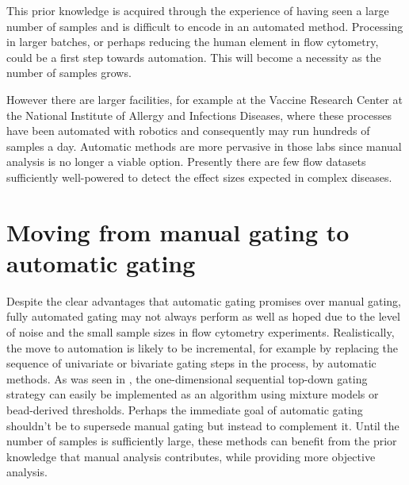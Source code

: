 This prior knowledge is acquired through the experience of having seen a large number of samples and is difficult to encode in an automated method.
Processing in larger batches, or perhaps reducing the human element in flow cytometry, could be a first step towards automation.
This will become a necessity as the number of samples grows.

However there are larger facilities, for example at the Vaccine Research Center at the National Institute of Allergy and Infections Diseases, where these processes have been automated with robotics and consequently may run hundreds of samples a day.
Automatic methods are more pervasive in those labs since manual analysis is no longer a viable option.
Presently there are few flow datasets sufficiently well-powered to detect the effect sizes expected in complex diseases.


\section{ Moving from manual gating to automatic gating }

Despite the clear advantages that automatic gating promises over manual gating, fully automated gating may not always perform as well as hoped due to the level of noise and the small sample sizes in flow cytometry experiments.
Realistically, the move to automation is likely to be incremental, for example by replacing the sequence of univariate or bivariate gating steps in the process, by automatic methods.
As was seen in , the one-dimensional sequential top-down gating strategy can easily be implemented as an algorithm using mixture models or bead-derived thresholds.  
Perhaps the immediate goal of automatic gating shouldn't be to supersede manual gating but instead to complement it.
Until the number of samples is sufficiently large, these methods can benefit from the prior knowledge that manual analysis contributes, while providing more objective analysis.

